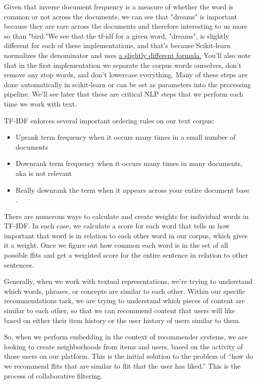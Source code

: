 \documentclass[11pt, table]{diazessay} %
\begin{document}
\begin{sloppypar}
Given that inverse document frequency is a measure of whether the word is common or not across the documents, we can see that "dreams" is important because they are rare across the documents and therefore interesting to us more so than "bird."We see that the tf-idf for a given word, "dreams", is slightly different for each of these implementations, and that's because Scikit-learn normalizes the denominator and uses \href{https://scikit-learn.org/stable/modules/generated/sklearn.feature_extraction.text.TfidfTransformer.html#sklearn.feature_extraction.text.TfidfTransformer}{a slightly different formula.}  You'll also note that in the first implementation we separate the corpus words ourselves, don't remove any stop words, and don't lowercase everything. Many of these steps are done automatically in scikit-learn or can be set as parameters into the processing pipeline. We'll see later that these are critical NLP steps that we perform each time we work with text.

TF-IDF enforces several important ordering rules on our text corpus:

\begin{itemize}
  \item Uprank term frequency when it occurs many times in a small number of documents
  \item Downrank term frequency when it occurs many times in many documents, aka is not relevant
  \item Really downrank the term when it appears across your entire document base \citep{schutze2008introduction}.
\end{itemize}

There are numerous ways to calculate and create weights for individual words in TF-IDF. In each case, we calculate a score for each word that tells us how important that word is in relation to each other word in our corpus, which gives it a weight. Once we figure out how common each word is in the set of all possible flits and get a weighted score for the entire sentence in relation to other sentences.

Generally, when we work with textual representations, we’re trying to understand which words, phrases, or concepts are similar to each other. Within our specific recommendations task, we are trying to understand which pieces of content are similar to each other, so that we can recommend content that users will like based on either their item history or the user history of users similar to them.

So, when we perform embedding in the context of recommender systems, we are looking to create neighborhoods from items and users, based on the activity of those users on our platform.  This is the initial solution to the problem of “how do we recommend flits that are similar to flit that the user has liked.” This is the process of collaborative filtering.


\end{sloppypar}
\end{document}
